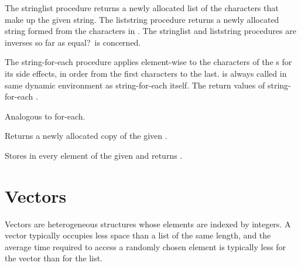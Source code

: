\begin{entry}{%
}

The {\cf string\coerce{}list} procedure returns a newly allocated list of the
characters that make up the given string.  The {\cf
  list\coerce{}string} procedure
returns a newly allocated string formed from the characters in 
. The {\cf string\coerce{}list}
and {\cf list\coerce{}string} procedures are
inverses so far as {\cf equal?}\ is concerned.  
\end{entry}

\begin{entry}{%
}

The {\cf string-for-each} procedure applies 
element-wise to the characters of the
s for its side effects,  in order from the first characters to the
last.
 is always called in same dynamic environment 
as {\cf string-for-each} itself.
The return values of {\cf string-for-each} \areunspecified.

Analogous to {\cf for-each}.
\end{entry}

\begin{entry}{%
}

Returns a newly allocated copy of the given .

\end{entry}


\begin{entry}{%
}

Stores  in every element of the given  and returns \unspecifiedreturn.  %

\end{entry}

\section{Vectors}
\label{vectorsection}

Vectors are heterogeneous structures whose elements are indexed
by integers.  A vector typically occupies less space than a list
of the same length, and the average time required to access a randomly
chosen element is typically less for the vector than for the list.

